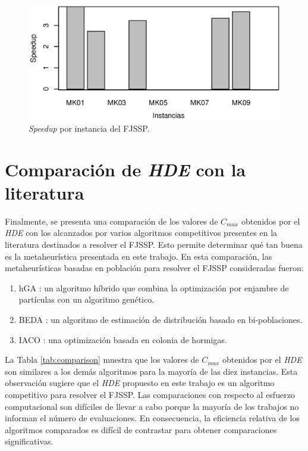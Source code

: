 \begin{figure}[H]
    \centering
    \includegraphics[trim={0 1cm 0 0.7cm},scale=0.7]{images/speedup.eps}
    \caption{\textit{Speedup} por instancia del FJSSP.}
    \label{fig:speedup}
\end{figure}

\section{Comparación de \textit{HDE} con la literatura}

Finalmente, se presenta una comparación de los valores de $C_{max}$ obtenidos por el \textit{HDE} con los alcanzados por varios algoritmos competitivos presentes en la literatura destinados a resolver el FJSSP. Esto permite determinar qué tan buena es la metaheurística presentada en este trabajo. En esta comparación, las metaheurísticas basadas en población para resolver el FJSSP consideradas fueron:

\begin{enumerate}[label=\textit{\roman*})]

\item hGA \cite{tang2011}: un algoritmo híbrido que combina la optimización por enjambre de partículas con un algoritmo genético.

\item BEDA \cite{Wang2012917}: un algoritmo de estimación de distribución basado en bi-poblaciones.

\item IACO \cite{WANG2017}: una optimización basada en colonia de hormigas.

\end{enumerate}

La Tabla \ref{tab:comparison} muestra que los valores de $C_{max}$ obtenidos por el \textit{HDE} son similares a los demás algoritmos para la mayoría de las diez instancias. Esta observación sugiere que el \textit{HDE} propuesto en este trabajo es un algoritmo competitivo para resolver el FJSSP. Las comparaciones con respecto al esfuerzo computacional son difíciles de llevar a cabo porque la mayoría de los trabajos no informan el número de evaluaciones. En consecuencia, la eficiencia relativa de los algoritmos comparados es difícil de contrastar para obtener comparaciones significativas.


